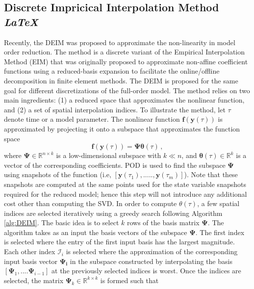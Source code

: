 \documentclass[]{interact}
\theoremstyle{plain}%
\theoremstyle{definition}
\theoremstyle{remark}
\begin{document}
\subsection{Discrete Impricical Interpolation Method \emph{\LaTeX}}

\label{sec:DEIM}
Recently, the DEIM \cite{chaturantabut2010nonlinear} was proposed to approximate the non-linearity in model order reduction.
The method is a discrete variant of the Empirical Interpolation Method (EIM) \cite{barrault2004empirical} that was originally proposed to approximate
non-affine coefficient functions using a reduced-basis expansion to facilitate the online/offline decomposition in finite element methods.
The DEIM is proposed for the same goal for different discretizations of the full-order model.
The method relies on two main ingredients: (1) a reduced space that approximates the nonlinear function, and (2) a set of spatial interpolation indices.
To illustrate the method, let $\tau$ denote time or a model parameter.
The nonlinear function $\mathbf{f}(\textbf{y}(\tau))$ is approximated by projecting it onto a subspace that approximates the function space
\begin{equation}
\mathbf{f}(\textbf{y}(\tau)) = \mathbf{\Psi}\boldsymbol{\theta}(\tau)\, ,
\end{equation}
where $\mathbf{\Psi} \in \mathbb{R}^{n\times k}$ is a low-dimensional subspace with $k \ll n$, and $\boldsymbol{\theta}(\tau) \in \mathbb{R}^k$ is a vector of the corresponding coefficients.
POD is used to find the subspace $\mathbf{\Psi}$ using snapshots of the function (i.e, $[\textbf{y}(\tau_1), ....., \textbf{y}(\tau_m)]$).
Note that these snapshots are computed at the same points used for the state variable snapshots required for the reduced model; hence this step will not introduce any additional cost other than computing the SVD.
In order to compute $\theta(\tau)$, a few spatial indices are selected iteratively using a greedy search following Algorithm \ref{alg:DEIM}.
The basic idea is to select $k$ rows of the basis matrix $\mathbf{\Psi}$.
The algorithm takes as an input the basis vectors of the subspace $\mathbf{\Psi}$.
The first index is selected where the entry of the first input basis has the largest magnitude.
Each other index $\mathcal{I}_i$ is selected where the approximation of the corresponding input basis vector $\mathbf{\Psi_i}$ in the subspace constructed by interpolating the basis $[\mathbf{\Psi}_1, ....\mathbf{\Psi}_{i-1}]$ at the previously selected indices is worst.
Once the indices are selected, the matrix $\mathbf{\Psi}_k \in \mathbb{R}^{k\times k}$ is formed such that
\end{document}
